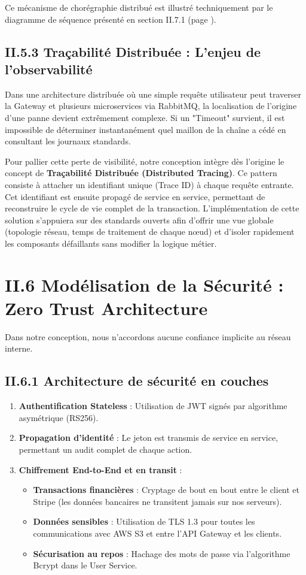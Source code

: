 Ce mécanisme de chorégraphie distribué est illustré techniquement par le diagramme de séquence présenté en section II.7.1 (page \pageref{fig:sequence_saga}).

\subsection{II.5.3 Traçabilité Distribuée : L'enjeu de l'observabilité}

Dans une architecture distribuée où une simple requête utilisateur peut traverser la Gateway et plusieurs microservices via RabbitMQ, la localisation de l'origine d'une panne devient extrêmement complexe. Si un "Timeout" survient, il est impossible de déterminer instantanément quel maillon de la chaîne a cédé en consultant les journaux standards.

Pour pallier cette perte de visibilité, notre conception intègre dès l'origine le concept de \textbf{Traçabilité Distribuée (Distributed Tracing)}. Ce pattern consiste à attacher un identifiant unique (Trace ID) à chaque requête entrante. Cet identifiant est ensuite propagé de service en service, permettant de reconstruire le cycle de vie complet de la transaction. L'implémentation de cette solution s'appuiera sur des standards ouverts afin d'offrir une vue globale (topologie réseau, temps de traitement de chaque nœud) et d'isoler rapidement les composants défaillants sans modifier la logique métier.

\section{II.6 Modélisation de la Sécurité : Zero Trust Architecture}
\label{sec:security_master}

Dans notre conception, nous n'accordons aucune confiance implicite au réseau interne.

\subsection{II.6.1 Architecture de sécurité en couches}
\begin{enumerate}
    \item \textbf{Authentification Stateless} : Utilisation de JWT signés par algorithme asymétrique (RS256).
    \item \textbf{Propagation d'identité} : Le jeton est transmis de service en service, permettant un audit complet de chaque action.
    \item \textbf{Chiffrement End-to-End et en transit} : 
    \begin{itemize}
        \item \textbf{Transactions financières} : Cryptage de bout en bout entre le client et Stripe (les données bancaires ne transitent jamais sur nos serveurs).
        \item \textbf{Données sensibles} : Utilisation de TLS 1.3 pour toutes les communications avec AWS S3 et entre l'API Gateway et les clients.
        \item \textbf{Sécurisation au repos} : Hachage des mots de passe via l'algorithme Bcrypt dans le User Service.
    \end{itemize}
\end{enumerate}

